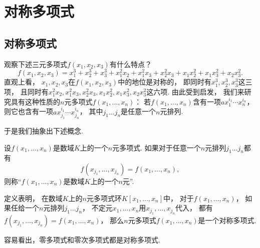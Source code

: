 \section{对称多项式}
\subsection{对称多项式}
观察下述三元多项式\(f(x_1,x_2,x_3)\)有什么特点？
\begin{equation*}
	f(x_1,x_2,x_3)
	=x_1^3+x_2^3+x_3^3
	+x_1^2x_2
	+x_1^2x_3
	+x_2^2x_3
	+x_1x_2^2
	+x_1x_3^2
	+x_2x_3^2.
\end{equation*}
直观上看，
\(x_1,x_2,x_3\)在\(f(x_1,x_2,x_3)\)中的地位是对称的，
即同时有\(x_1^3,x_2^3,x_3^3\)这三项，
且同时有\(x_1^2x_2,
x_1^2x_3,
x_2^2x_3,
x_1x_2^2,
x_1x_3^2,
x_2x_3^2\)这六项.
由此受到启发，
我们来研究具有这种性质的\(n\)元多项式\(f(x_1,\dotsc,x_n)\)：
若\(f(x_1,\dotsc,x_n)\)含有一项\(a x_1^{i_1} \dotsm x_n^{i_n}\)，
则它也含有一项\(a x_{j_1}^{i_1} \dotsm x_{j_n}^{i_n}\)，
其中\(j_1 \dotso j_n\)是任意一个\(n\)元排列.

于是我们抽象出下述概念.
\begin{definition}
设\(f(x_1,\dotsc,x_n)\)是数域\(K\)上的一个\(n\)元多项式.
如果对于任意一个\(n\)元排列\(j_1 \dotso j_n\)都有\begin{equation*}
	f(x_{j_1},\dotsc,x_{j_n})
	=f(x_1,\dotsc,x_n),
\end{equation*}
则称“\(f(x_1,\dotsc,x_n)\)是数域\(K\)上的一个\(n\)元”.
\end{definition}

定义表明，
在数域\(K\)上的\(n\)元多项式环\(K[x_1,\dotsc,x_n]\)中，
对于\(f(x_1,\dotsc,x_n)\)，
如果任给一个\(n\)元排列\(j_1 \dotso j_n\)，
不定元\(x_1,\dotsc,x_n\)用\(x_{j_1},\dotsc,x_{j_n}\)代入，
都有\(f(x_{j_1},\dotsc,x_{j_n})=f(x_1,\dotsc,x_n)\)，
那么\(n\)元多项式\(f(x_1,\dotsc,x_n)\)是一个对称多项式.

容易看出，零多项式和零次多项式都是对称多项式.

